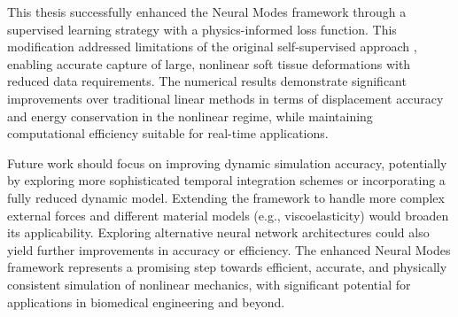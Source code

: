 \documentclass[11pt,a4paper,twocolumn]{article}
\begin{document}
This thesis successfully enhanced the Neural Modes framework through a supervised learning strategy with a physics-informed loss function. This modification addressed limitations of the original self-supervised approach \cite{Wang_Du_Coros_Thomaszewski_2024}, enabling accurate capture of large, nonlinear soft tissue deformations with reduced data requirements. The numerical results demonstrate significant improvements over traditional linear methods in terms of displacement accuracy and energy conservation in the nonlinear regime, while maintaining computational efficiency suitable for real-time applications.

Future work should focus on improving dynamic simulation accuracy, potentially by exploring more sophisticated temporal integration schemes or incorporating a fully reduced dynamic model. Extending the framework to handle more complex external forces and different material models (e.g., viscoelasticity) would broaden its applicability. Exploring alternative neural network architectures could also yield further improvements in accuracy or efficiency. The enhanced Neural Modes framework represents a promising step towards efficient, accurate, and physically consistent simulation of nonlinear mechanics, with significant potential for applications in biomedical engineering and beyond.


\end{document}
